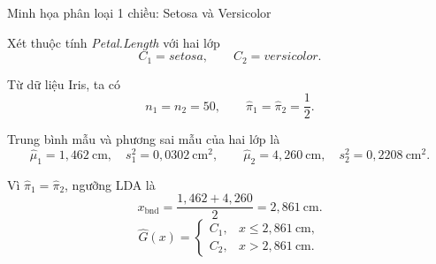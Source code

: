 \documentclass{beamer}
\begin{document}
\begin{frame}{Minh họa phân loại 1 chiều: Setosa và Versicolor}
	\small
	
	Xét thuộc tính \textit{Petal.Length} với hai lớp
	\[
	C_1=\textit{setosa},\qquad C_2=\textit{versicolor}.
	\]
	
	Từ dữ liệu Iris, ta có
	\[
	n_1=n_2=50,\qquad \widehat{\pi}_1=\widehat{\pi}_2=\frac{1}{2}.
	\]
	
	Trung bình mẫu và phương sai mẫu của hai lớp là
	\[
	\widehat{\mu}_1=1{,}462\ \text{cm},\quad s_1^2=0{,}0302\ \text{cm}^2,
	\qquad
	\widehat{\mu}_2=4{,}260\ \text{cm},\quad s_2^2=0{,}2208\ \text{cm}^2.
	\]
	
	Vì \(\widehat{\pi}_1=\widehat{\pi}_2\), ngưỡng LDA là
	\[
	x_{\text{bnd}}
	=
	\frac{1{,}462+4{,}260}{2}
	=
	2{,}861\ \text{cm}.
	\]
	\[
	\widehat{G}(x)
	=
	\begin{cases}
		C_1, & x\le 2{,}861\ \text{cm},\\
		C_2, & x>2{,}861\ \text{cm}.
	\end{cases}
	\]
	
\end{frame}
\end{document}
